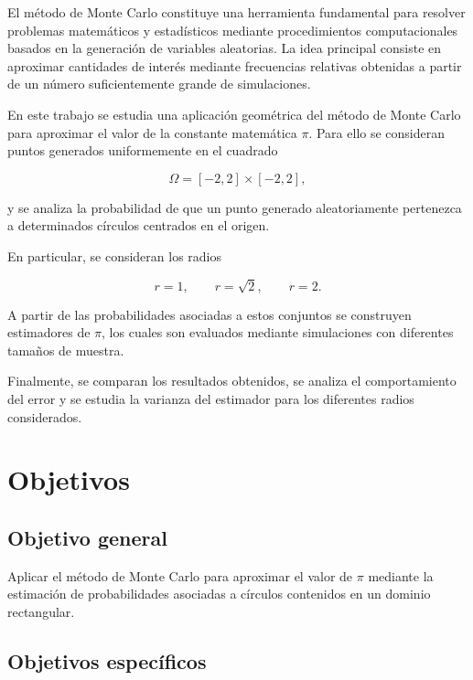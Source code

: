 \documentclass[12pt,a4paper]{article}
\begin{document}
El método de Monte Carlo constituye una herramienta fundamental para
resolver problemas matemáticos y estadísticos mediante procedimientos
computacionales basados en la generación de variables aleatorias.
La idea principal consiste en aproximar cantidades de interés mediante
frecuencias relativas obtenidas a partir de un número suficientemente
grande de simulaciones.

En este trabajo se estudia una aplicación geométrica del método de
Monte Carlo para aproximar el valor de la constante matemática
\(\pi\). Para ello se consideran puntos generados uniformemente en el
cuadrado

\[
\Omega=[-2,2]\times[-2,2],
\]

y se analiza la probabilidad de que un punto generado aleatoriamente
pertenezca a determinados círculos centrados en el origen.

En particular, se consideran los radios

\[
r=1,\qquad r=\sqrt{2},\qquad r=2.
\]

A partir de las probabilidades asociadas a estos conjuntos se construyen
estimadores de \(\pi\), los cuales son evaluados mediante simulaciones
con diferentes tamaños de muestra.

Finalmente, se comparan los resultados obtenidos, se analiza el
comportamiento del error y se estudia la varianza del estimador para
los diferentes radios considerados.


\section{Objetivos}

\subsection{Objetivo general}

Aplicar el método de Monte Carlo para aproximar el valor de \(\pi\)
mediante la estimación de probabilidades asociadas a círculos contenidos
en un dominio rectangular.

\subsection{Objetivos específicos}
\end{document}
